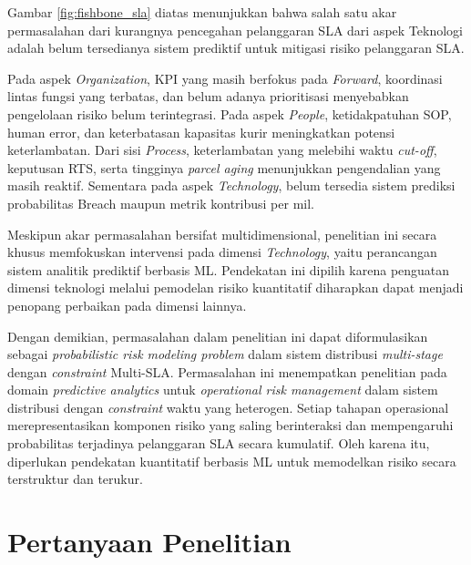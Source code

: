 Gambar \ref{fig:fishbone_sla} diatas menunjukkan bahwa salah satu akar permasalahan dari kurangnya pencegahan pelanggaran SLA dari aspek Teknologi adalah belum tersedianya sistem prediktif untuk mitigasi risiko pelanggaran SLA.

Pada aspek \textit{Organization}, KPI yang masih berfokus pada \textit{Forward}, koordinasi lintas fungsi yang terbatas, dan belum adanya prioritisasi menyebabkan pengelolaan risiko belum terintegrasi. Pada aspek \textit{People}, ketidakpatuhan SOP, human error, dan keterbatasan kapasitas kurir meningkatkan potensi keterlambatan. Dari sisi \textit{Process}, keterlambatan yang melebihi waktu \textit{cut-off}, keputusan RTS, serta tingginya \textit{parcel aging} menunjukkan pengendalian yang masih reaktif. Sementara pada aspek \textit{Technology}, belum tersedia sistem prediksi probabilitas Breach maupun metrik kontribusi per mil.

Meskipun akar permasalahan bersifat multidimensional, penelitian ini secara khusus memfokuskan intervensi pada dimensi \textit{Technology}, yaitu perancangan sistem analitik prediktif berbasis ML. Pendekatan ini dipilih karena penguatan dimensi teknologi melalui pemodelan risiko kuantitatif diharapkan dapat menjadi penopang perbaikan pada dimensi lainnya.

Dengan demikian, permasalahan dalam penelitian ini dapat diformulasikan sebagai \textit{probabilistic risk modeling problem} dalam sistem distribusi \textit{multi-stage} dengan \textit{constraint} Multi-SLA.  Permasalahan ini menempatkan penelitian pada domain \textit{predictive analytics} untuk \textit{operational risk management} dalam sistem distribusi dengan \textit{constraint} waktu yang heterogen. Setiap tahapan operasional merepresentasikan komponen risiko yang saling berinteraksi dan mempengaruhi probabilitas terjadinya pelanggaran SLA secara kumulatif. Oleh karena itu, diperlukan pendekatan kuantitatif berbasis ML untuk memodelkan risiko secara terstruktur dan terukur.

\section{Pertanyaan Penelitian}
\label{sec:rq}

